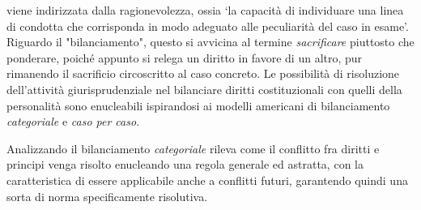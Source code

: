 viene indirizzata dalla ragionevolezza, ossia ‘la capacità di individuare una linea di condotta che corrisponda in modo adeguato alle peculiarità del caso in esame’.
Riguardo il "bilanciamento", questo si avvicina al termine \textit{sacrificare} piuttosto che ponderare, poiché appunto si relega un diritto in favore di un altro, pur rimanendo  il sacrificio circoscritto al caso concreto.
Le possibilità di risoluzione dell'attività giurisprudenziale nel bilanciare diritti costituzionali con quelli della personalità sono enucleabili ispirandosi ai modelli americani di bilanciamento \textit{categoriale} e \textit{caso per caso}.

Analizzando il bilanciamento \textit{categoriale} rileva come il conflitto fra diritti e principi venga risolto enucleando una regola generale ed astratta, con la caratteristica di essere applicabile anche a conflitti futuri, garantendo quindi una sorta di norma specificamente risolutiva.

